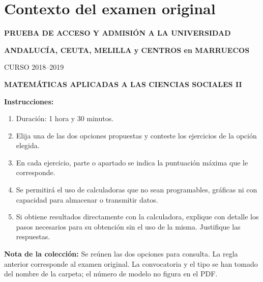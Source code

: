 \section*{Contexto del examen original}
\textbf{PRUEBA DE ACCESO Y ADMISIÓN A LA UNIVERSIDAD}\par
\textbf{ANDALUCÍA, CEUTA, MELILLA y CENTROS en MARRUECOS}\par
CURSO 2018--2019\par
\textbf{MATEMÁTICAS APLICADAS A LAS CIENCIAS SOCIALES II}

\textbf{Instrucciones:}
\begin{enumerate}[label=\textbf{\alph*)}]
  \item Duración: 1 hora y 30 minutos.
  \item Elija una de las dos opciones propuestas y conteste los ejercicios de la opción elegida.
  \item En cada ejercicio, parte o apartado se indica la puntuación máxima que le corresponde.
  \item Se permitirá el uso de calculadoras que no sean programables, gráficas ni con capacidad para almacenar o transmitir datos.
  \item Si obtiene resultados directamente con la calculadora, explique con detalle los pasos necesarios para su obtención sin el uso de la misma. Justifique las respuestas.
\end{enumerate}
\noindent\textbf{Nota de la colección:} Se reúnen las dos opciones para consulta.
La regla anterior corresponde al examen original. La convocatoria y el tipo
se han tomado del nombre de la carpeta; el número de modelo no figura en el PDF.
\par\medskip
